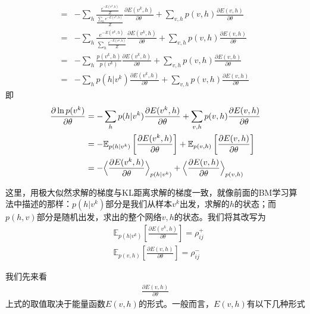 {\begin{align*}
            ={}&-\sum_h\frac{\frac{e^{-E(v^k,h)}}{Z}}{\frac{\sum_he^{-E(v^k,h)}}{Z}}\frac{\partial E(v^k,h)}{\partial \theta} + \sum_{v,h}p(v,h)\frac{\partial E(v,h)}{\partial \theta}\\
            ={}&- \sum_h \frac{e^{-E(v^k,h)}}{\sum_h\frac{e^{-E(v^k,h)}}{Z}}\frac{\partial E(v^k,h)}{\partial \theta} + \sum_{v,h}p(v,h)\frac{\partial E(v,h)}{\partial \theta}\\
            ={}& -\sum_h \frac{p(v^k,h)}{p(v^k)}\frac{\partial E(v^k,h)}{\partial \theta} + \sum_{v,h}p(v,h)\frac{\partial E(v,h)}{\partial \theta}\\
            ={}& - \sum_h p(h|v^k)\frac{\partial E(v^k,h)}{\partial \theta} + \sum_{v,h}p(v,h)\frac{\partial E(v,h)}{\partial \theta}
            \end{align*}
            即
            \begin{align}
            \label{BM极大似然估计梯度}
            \frac{\partial \ln p(v^k)}{\partial \theta} & = -\sum_h p(h|v^k)\frac{\partial E(v^k,h)}{\partial \theta} + \sum_{v,h}p(v,h)\frac{\partial E(v,h)}{\partial \theta} \\
            & =- \mathbb{E}_{p(h|v^k)} \left[ \frac{\partial E(v^k,h)}{\partial \theta} \right] + \mathbb{E}_{p(v,h)} \left[ \frac{\partial E(v,h)}{\partial \theta}  \right]\notag\\
            & =-\Big<\frac{\partial E(v^k,h)}{\partial \theta}  \Big>_{p(h|v^k)} + \Big<\frac{\partial E(v,h)}{\partial \theta}  \Big>_{p(v,h)} \notag
            \end{align}
            \par
            这里，用极大似然求解的梯度与KL距离求解的梯度一致，就像前面的BM学习算法中描述的那样：$p(h|v^k)$部分是我们从样本$v^k$出发，求解的$h$的状态；而$p(h,v)$部分是随机出发，求出的整个网络$v,h$的状态。我们将其改写为
            \begin{align*}
            & \mathbb{E}_{p(h|v^k)} \left[ \frac{\partial E(v^k,h)}{\partial \theta} \right] = \rho_{ij}^+\\
            & \mathbb{E}_{p(v,h)} \left[ \frac{\partial E(v,h)}{\partial \theta}  \right] = \rho_{ij}^-
            \end{align*}
            \par
            我们先来看
            \begin{align*}
            \frac{\partial E(v,h)}{\partial \theta}
            \end{align*}
            上式的取值取决于能量函数$E(v,h)$的形式。一般而言，$E(v,h)$有以下几种形式
}
